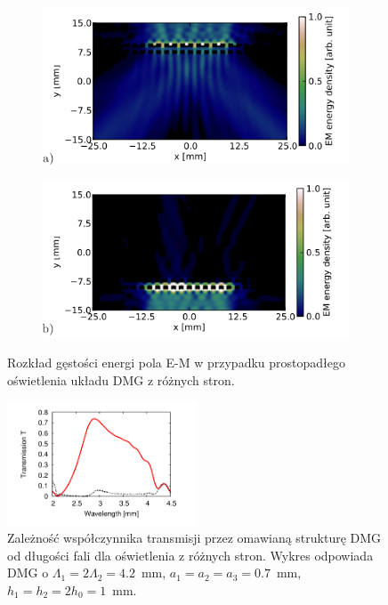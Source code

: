 \begin{figure}
	\begin{subfigure}{0.45\textwidth}
		\includegraphics[width=\textwidth]{images/thz/opt_lett_gora.png}
		\label{fig:trans_gora}
	\end{subfigure}
	\begin{subfigure}{0.45\textwidth}
		\includegraphics[width=\textwidth]{images/thz/opt_letters_dol.png}
		\label{fig:trans_dol}
	\end{subfigure}
	\caption{Rozkład gęstości energi pola E-M w przypadku prostopadłego oświetlenia układu DMG z różnych stron. }
	\label{fig:tras_gora_dol}
\end{figure}

\begin{figure}	
	\centering
	\includegraphics[width=0.5\textwidth]{images/thz/opt_lett_spect.png}
	\caption{Zależność współczynnika transmisji przez omawianą strukturę DMG od długości fali dla oświetlenia z różnych stron. Wykres odpowiada DMG o $\Lambda_1= 2 \Lambda_2 = 4.2$~mm, $a_1=a_2=a_3=0.7$~mm, $h_1=h_2=2 h_0=1$~mm.}
	\label{fig:trans_freq}

\end{figure}
